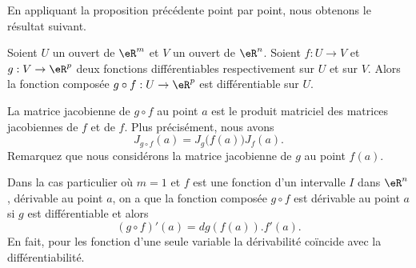 En appliquant la proposition précédente point par point, nous obtenons le résultat suivant.
\begin{proposition}
Soient $U$ un ouvert de $\eR^m$ et $V$ un ouvert de $\eR^n$. Soient $f: U\to V$  et $g: V \to \eR^p$ deux fonctions différentiables respectivement sur $U $ et sur $V$. Alors la fonction composée $g\circ f: U\to \eR^p $ est différentiable sur $U$.
\end{proposition}
La matrice jacobienne de $g\circ f$ au point $a$ est le produit matriciel des matrices jacobiennes de $f$ et de $f$. Plus précisément, nous avons
\begin{equation}
	J_{g\circ f}(a)=J_g\big( f(a) \big)J_f(a).
\end{equation}
Remarquez que nous considérons la matrice jacobienne de $g$ au point $f(a)$.

Dans la cas particulier où $m=1$ et $f$ est une fonction d'un intervalle $I$ dans $\eR^n$, dérivable au point $a$, on a que la fonction composée $g\circ f$ est dérivable au point $a$ si $g$ est différentiable et alors
\[
(g\circ f)'(a)= dg\left(f(a)\right).f'(a).
\]
En fait, pour les fonction d'une seule variable la dérivabilité coïncide avec la différentiabilité.

